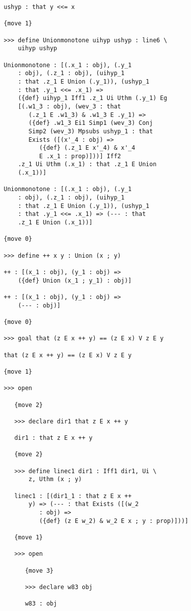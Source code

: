 \documentclass[12pt]{article}
\begin{document}
\begin{verbatim}
   ushyp : that y <<= x

   {move 1}

   >>> define Unionmonotone uihyp ushyp : line6 \
       uihyp ushyp

   Unionmonotone : [(.x_1 : obj), (.y_1 
       : obj), (.z_1 : obj), (uihyp_1 
       : that .z_1 E Union (.y_1)), (ushyp_1 
       : that .y_1 <<= .x_1) => 
       ({def} uihyp_1 Iff1 .z_1 Ui Uthm (.y_1) Eg 
       [(.w1_3 : obj), (wev_3 : that 
          (.z_1 E .w1_3) & .w1_3 E .y_1) => 
          ({def} .w1_3 Ei1 Simp1 (wev_3) Conj 
          Simp2 (wev_3) Mpsubs ushyp_1 : that 
          Exists ([(x'_4 : obj) => 
             ({def} (.z_1 E x'_4) & x'_4 
             E .x_1 : prop)]))] Iff2 
       .z_1 Ui Uthm (.x_1) : that .z_1 E Union 
       (.x_1))]

   Unionmonotone : [(.x_1 : obj), (.y_1 
       : obj), (.z_1 : obj), (uihyp_1 
       : that .z_1 E Union (.y_1)), (ushyp_1 
       : that .y_1 <<= .x_1) => (--- : that 
       .z_1 E Union (.x_1))]

   {move 0}

   >>> define ++ x y : Union (x ; y)

   ++ : [(x_1 : obj), (y_1 : obj) => 
       ({def} Union (x_1 ; y_1) : obj)]

   ++ : [(x_1 : obj), (y_1 : obj) => 
       (--- : obj)]

   {move 0}

   >>> goal that (z E x ++ y) == (z E x) V z E y

   that (z E x ++ y) == (z E x) V z E y

   {move 1}

   >>> open

      {move 2}

      >>> declare dir1 that z E x ++ y

      dir1 : that z E x ++ y

      {move 2}

      >>> define linec1 dir1 : Iff1 dir1, Ui \
          z, Uthm (x ; y)

      linec1 : [(dir1_1 : that z E x ++ 
          y) => (--- : that Exists ([(w_2 
             : obj) => 
             ({def} (z E w_2) & w_2 E x ; y : prop)]))]

      {move 1}

      >>> open

         {move 3}

         >>> declare w83 obj

         w83 : obj


\end{verbatim}
\end{document}
